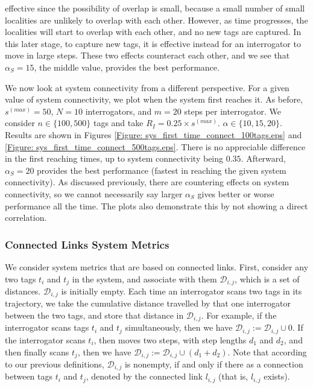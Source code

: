 effective since the possibility of overlap is small, because a small number of small localities are unlikely to overlap with each other. However, as time progresses, the localities will start to overlap with each other, and no new tags are captured. In this later stage, to capture new tags, it is effective instead for an interrogator to move in large steps. These two effects counteract each other, and we see that $\alpha_S = 15$, the middle value, provides the best performance.

We now look at system connectivity from a different perspective. For a given value of system connectivity, we plot when the system first reaches it. As before, $s^{(max)} = 50$, $N = 10$ interrogators, and $m = 20$ steps per interrogator. We consider $n \in \{100, 500\}$ tags and take $R_I = 0.25 \times s^{(max)}$. $\alpha \in \{10, 15, 20\}$. Results are shown in Figures \ref{Figure: sys_first_time_connect_100tags.eps} and \ref{Figure: sys_first_time_connect_500tags.eps}. There is no appreciable difference in the first reaching times, up to system connectivity being $0.35$. Afterward, $\alpha_S = 20$ provides the best performance (fastest in reaching the given system connectivity). As discussed previously, there are countering effects on system connectivity, so we cannot necessarily say larger $\alpha_S$ gives better or worse performance all the time. The plots also demonstrate this by not showing a direct correlation. 
\subsubsection{\textbf{Connected Links System Metrics}}
We consider system metrics that are based on connected links. First, consider any two tags $t_i$ and $t_j$ in the system, and associate with them $\mathcal{D}_{i,j}$, which is a set of distances. $\mathcal{D}_{i,j}$ is initially empty. Each time an interrogator scans two tags in its trajectory, we take the cumulative distance travelled by that one interrogator between the two tags, and store that distance in $\mathcal{D}_{i,j}$. For example, if the interrogator scans tags $t_i$ and $t_j$ simultaneously, then we have $\mathcal{D}_{i,j} := \mathcal{D}_{i,j} \cup 0$. If the interrogator scans $t_i$, then moves two steps, with step lengths $d_1$ and $d_2$, and then finally scans $t_j$, then we have $\mathcal{D}_{i,j} := \mathcal{D}_{i,j} \cup \left(d_1 + d_2\right)$. Note that according to our previous definitions, $\mathcal{D}_{i,j}$ is nonempty, if and only if there as a connection between tags $t_i$ and $t_j$, denoted by the connected link $l_{i,j}$ (that is, $l_{i,j}$ exists).

